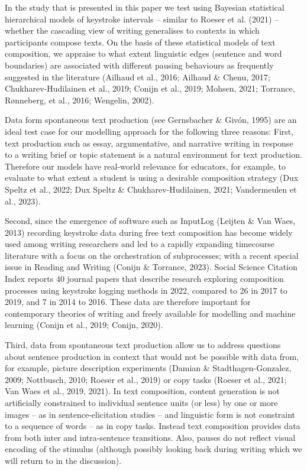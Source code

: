 \documentclass[
  man,floatsintext]{apa7}
\begin{document}
In the study that is presented in this paper we test using Bayesian statistical hierarchical models of keystroke intervals -- similar to Roeser et al. (2021) -- whether the cascading view of writing generalises to contexts in which participants compose texts. On the basis of these statistical models of text composition, we appraise to what extent linguistic edges (sentence and word boundaries) are associated with different pausing behaviours as frequently suggested in the literature (Ailhaud et al., 2016; Ailhaud \& Chenu, 2017; Chukharev-Hudilainen et al., 2019; Conijn et al., 2019; Mohsen, 2021; Torrance, Rønneberg, et al., 2016; Wengelin, 2002).

Data form spontaneous text production (see Gernsbacher \& Givón, 1995) are an ideal test case for our modelling approach for the following three reasons: First, text production such as essay, argumentative, and narrative writing in response to a writing brief or topic statement is a natural environment for text production. Therefore our models have real-world relevance for educators, for example, to evaluate to what extent a student is using a desirable composition strategy (Dux Speltz et al., 2022; Dux Speltz \& Chukharev-Hudilainen, 2021; Vandermeulen et al., 2023).

Second, since the emergence of software such as InputLog (Leijten \& Van Waes, 2013) recording keystroke data during free text composition has become widely used among writing researchers and led to a rapidly expanding timecourse literature with a focus on the orchestration of subprocesses; with a recent special issue in Reading and Writing (Conijn \& Torrance, 2023). Social Science Citation Index reports 40 journal papers that describe research exploring composition processes using keystroke logging methods in 2022, compared to 26 in 2017 to 2019, and 7 in 2014 to 2016. These data are therefore important for contemporary theories of writing and freely available for modelling and machine learning (Conijn et al., 2019; Conijn, 2020).

Third, data from spontaneous text production allow us to address questions about sentence production in context that would not be possible with data from, for example, picture description experiments (Damian \& Stadthagen-Gonzalez, 2009; Nottbusch, 2010; Roeser et al., 2019) or copy tasks (Roeser et al., 2021; Van Waes et al., 2019, 2021). In text composition, content generation is not artificially constrained to individual sentence units (or less) by one or more images -- as in sentence-elicitation studies -- and linguistic form is not constraint to a sequence of words -- as in copy tasks. Instead text composition provides data from both inter and intra-sentence transitions. Also, pauses do not reflect visual encoding of the stimulus (although possibly looking back during writing which we will return to in the discussion).
\end{document}

